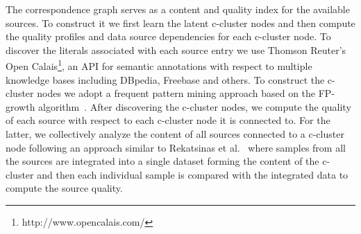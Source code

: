 \documentclass{vldb}
\begin{document}
The correspondence graph serves as a content and quality index for the available sources. To construct it we first learn the latent c-cluster nodes and then compute the quality profiles and data source dependencies for each c-cluster node. To discover the literals associated with each source entry we use Thomson Reuter's Open Calais\footnote{http://www.opencalais.com/}, an API for semantic annotations with respect to multiple knowledge bases including DBpedia, Freebase and others. To construct the c-cluster nodes we adopt a frequent pattern mining approach based on the FP-growth algorithm~\cite{Han:2000}.  After discovering the c-cluster nodes, we compute the quality of each source with respect to each c-cluster node it is connected to. For the latter, we collectively analyze the content of all sources connected to a c-cluster node following an approach similar to Rekatsinas et al.~\cite{rekatsinas:2014} where samples from all the sources are integrated into a single dataset forming the content of the c-cluster and then each individual sample is compared with the integrated data to compute the source quality. 
\end{document}
